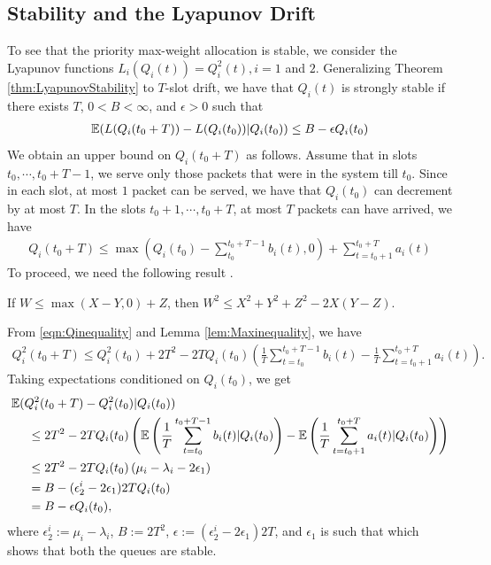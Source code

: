 \documentclass[10pt,a4paper]{article}
\begin{document}
\subsection{Stability and the Lyapunov Drift}
To see that the priority max-weight allocation is stable, we consider the Lyapunov functions $L_i(Q_i(t)) = Q_i^2(t), i = 1$ and $2$. Generalizing Theorem \ref{thm:LyapunovStability} to $T$-slot drift, we have that $Q_i(t)$ is strongly stable if there exists $T$, $0<B<\infty$, and $\epsilon>0$ such that 
\begin{align*}
\mathbb{E}(L(Q_i(t_0+T)) - L(Q_i(t_0))| Q_i(t_0)) \leq B - \epsilon Q_i(t_0)
\end{align*}
We obtain an upper bound on $Q_i(t_0+T)$ as follows. Assume that in slots $t_0,\cdots, t_0+T-1$, we serve only those packets that were in the system till $t_0.$ Since in each slot, at most $1$ packet can be served, we have that $Q_i(t_0)$ can decrement by at most $T$. In the slots $t_0+1, \cdots, t_0+T$, at most $T$ packets can have arrived, we have 
\begin{align} Q_i(t_0+T) \leq \max \left( Q_i(t_0) - \sum_{t_0}^{t_0+T-1} b_i(t) ,0 \right) + \sum_{t=t_0+1}^{t_0+T} a_i(t)  \label{eqn:Qinequality}
\end{align}
To proceed, we need the following result \cite{kumar2008wireless}.
\begin{lem}
\label{lem:Maxinequality}
If $W\leq \max(X-Y,0)+Z$, then $W^2\leq X^2+Y^2+Z^2-2X(Y-Z).$
\end{lem}
\noindent From \eqref{eqn:Qinequality} and Lemma \ref{lem:Maxinequality}, we have 
\begin{align*}
Q_i^2(t_0+T) \leq Q_i^2(t_0)+2T^2 - 2T Q_i(t_0)\left(\frac{1}{T}\sum_{t=t_0}^{t_0+T-1}b_i(t) -\frac{1}{T}\sum_{t=t_0+1}^{t_0+T} a_i(t) \right).
\end{align*}
Taking expectations conditioned on $Q_i(t_0)$, we get
\begin{align*}
&\mathbb{E}(Q_i^2(t_0+T)-Q_i^2(t_0)|Q_i(t_0) )\\
&~~~~\leq 2T^2 - 2T Q_i(t_0) \left(\mathbb{E}  \left(\frac{1}{T}\sum_{t=t_0}^{t_0+T-1}b_i(t) |Q_i(t_0)\right) -\mathbb{E}\left(\frac{1}{T}\sum_{t=t_0+1}^{t_0+T} a_i(t)|Q_i(t_0)\right) \right)\\
&~~~~\leq 2T^2 - 2TQ_i(t_0) \left( \mu_i-\lambda_i-2\epsilon_1\right) \\
&~~~~ = B - (\epsilon^{i}_2-2\epsilon_1) 2TQ_i(t_0)\\
&~~~~ = B - \epsilon Q_i(t_0),
\end{align*}
where $\epsilon^{i}_2 :=\mu_i -\lambda_i $, $B := 2T^2$, $\epsilon := (\epsilon^{i}_2-2\epsilon_1)2T$, and $\epsilon_1$ is such that 
which shows that both the queues are stable.
\end{document}
